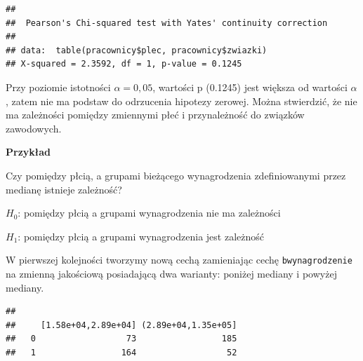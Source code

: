 \documentclass[]{book}
\newenvironment{Shaded}{\begin{snugshade}}{\end{snugshade}}
\newcommand{\DataTypeTok}[1]{\textcolor[rgb]{0.13,0.29,0.53}{#1}}
\newcommand{\KeywordTok}[1]{\textcolor[rgb]{0.13,0.29,0.53}{\textbf{#1}}}
\newcommand{\NormalTok}[1]{#1}
\newcommand{\OperatorTok}[1]{\textcolor[rgb]{0.81,0.36,0.00}{\textbf{#1}}}
\newcommand{\OtherTok}[1]{\textcolor[rgb]{0.56,0.35,0.01}{#1}}
\newcommand{\StringTok}[1]{\textcolor[rgb]{0.31,0.60,0.02}{#1}}
\begin{document}
\begin{verbatim}
## 
##  Pearson's Chi-squared test with Yates' continuity correction
## 
## data:  table(pracownicy$plec, pracownicy$zwiazki)
## X-squared = 2.3592, df = 1, p-value = 0.1245
\end{verbatim}

Przy poziomie istotności \(\alpha = 0,05\), wartości p (0.1245) jest większa od wartości \(\alpha\), zatem nie ma podstaw do odrzucenia hipotezy zerowej. Można stwierdzić, że nie ma zależności pomiędzy zmiennymi płeć i przynależność do związków zawodowych.

\textbf{Przykład}

Czy pomiędzy płcią, a grupami bieżącego wynagrodzenia zdefiniowanymi przez medianę istnieje zależność?

\(H_0\): pomiędzy płcią a grupami wynagrodzenia nie ma zależności

\(H_1\): pomiędzy płcią a grupami wynagrodzenia jest zależność

W pierwszej kolejności tworzymy nową cechą zamieniając cechę \texttt{bwynagrodzenie} na zmienną jakościową posiadającą dwa warianty: poniżej mediany i powyżej mediany.

\begin{Shaded}
\end{Shaded}

\begin{verbatim}
##    
##     [1.58e+04,2.89e+04] (2.89e+04,1.35e+05]
##   0                  73                 185
##   1                 164                  52
\end{verbatim}
\end{document}
